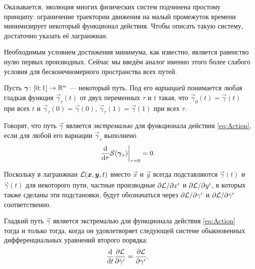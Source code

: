Оказывается, эволюция многих физических систем подчинена простому принципу: ограничение траектории движения на малый промежуток времени минимизирует некоторый функционал действия. Чтобы описать такую систему, достаточно указать её лагранжиан\footnotemark{}.


Необходимым условием достижения минимума, как известно, является равенство нулю первых производных. Сейчас мы введём аналог именно этого более слабого условия для бесконечномерного пространства всех путей.

\begin{definition}
	Пусть $\boldsymbol{\gamma}\colon [0; 1] \to \mathbb{R}^n$ --- некоторый путь. Под его \textit{вариацией} понимается любая гладкая функция $\vec{\gamma}_\tau(t)$ от двух переменных $\tau$ и $t$ такая, что $\vec{\gamma}_0(t) = \vec{\gamma}(t)$ при всех $t$ и $\vec{\gamma}_\tau(0) = \vec{\gamma}(0)$, $\vec{\gamma}_\tau(1) = \vec{\gamma}(1)$ при всех $\tau$.

	Говорят, что путь $\vec{\gamma}$ является \textit{экстремалью} для функционала действия \eqref{eq:Action}, если для любой его вариации $\vec{\gamma}_\tau$ выполнено
	\[
		\left.\frac{\mathop{}\!\mathrm{d}}{\mathop{}\!\mathrm{d}\tau}\mathcal{S}(\boldsymbol{\gamma}_\tau)\right|_{\tau = 0} = 0.
	\]
\end{definition}

Поскольку в лагранжиан $\mathcal{L}(\boldsymbol{x}, \boldsymbol{y}, t)$ вместо $\vec{x}$ и $\vec{y}$ всегда подставляются $\vec{\gamma}(t)$ и $\dot{\vec{\gamma}}(t)$ для некоторого пути, частные производные $\partial\mathcal{L} / \partial x^i$ и $\partial\mathcal{L} / \partial y^i$, в которых также сделаны эти подстановки, будут обозначаться через $\partial\mathcal{L} / \partial\gamma^i$ и $\partial\mathcal{L} / \partial\dot{\gamma}^i$ соответственно.

\begin{lemma}
	Гладкий путь $\vec{\gamma}$ является экстремалью для функционала действия \eqref{eq:Action} тогда и только тогда, когда он удовлетворяет следующей системе обыкновенных дифференциальных уравнений второго порядка:
	\begin{equation} \label{eq:EulerLagrange}
		\frac{\mathop{}\!\mathrm{d}}{\mathop{}\!\mathrm{d} t}\frac{\partial\mathcal{L}}{\partial\dot{\gamma}^i} = \frac{\partial\mathcal{L}}{\partial\gamma^i}.
	\end{equation}
\end{lemma}

